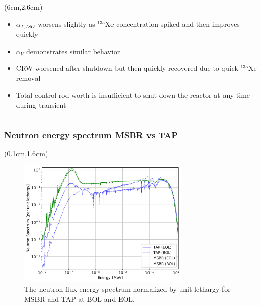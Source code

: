 \begin{frame}
\begin{textblock*}{12.5cm}
\begin{columns}
		\column[t]{6cm}
		\begin{textblock*}{6.7cm}(6cm,2.6cm) %
			\begin{itemize}
				\itemsep=0.8em
				\item<1-> $\alpha_{T,ISO}$ worsens slightly as $^{135}$Xe 
				concentration spiked and then improves quickly
				\item<2-> $\alpha_V$ demonstrates similar behavior
				\item<3-> CRW worsened after shutdown but then quickly 
				recovered due to quick $^{135}$Xe removal
				\item<4-> Total control rod worth is insufficient to shut down 
				the reactor at any time during transient
			\end{itemize}
			
		\end{textblock*}
	\end{columns}
\end{textblock*}
\end{frame}


\begin{frame}
\frametitle{Neutron energy spectrum MSBR vs TAP}
\begin{textblock*}{12.6cm}(0.1cm,1.6cm) %
	\begin{figure}[htp!] %
		\centerline{\includegraphics[width=0.73\textwidth]{../dissertation/figures/ch6/msbr_vs_tap_spectrum.png}}
		\vspace{-3mm}
		\caption{The neutron flux energy spectrum normalized by unit lethargy 
		for 
			MSBR and TAP at BOL and EOL. }
	\end{figure}
\end{textblock*}
\end{frame}